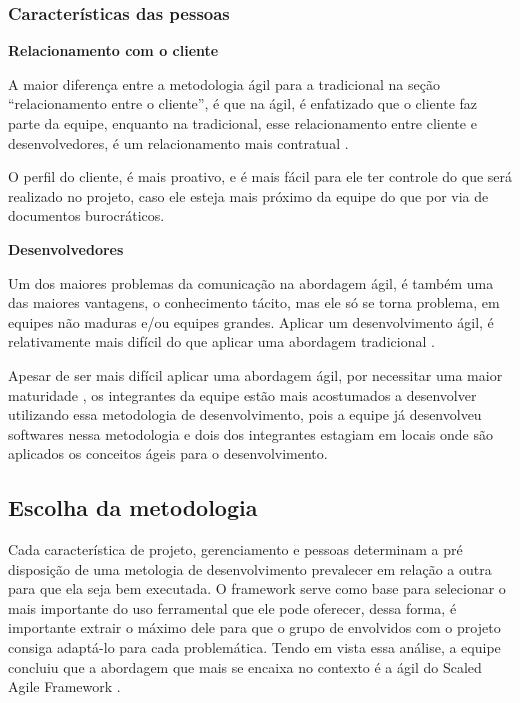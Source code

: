 \subsubsection{Características das pessoas}
\begin{description}

\item \textbf{Relacionamento com o cliente}

A maior diferença entre a metodologia ágil para a tradicional na seção “relacionamento entre o cliente”, é que na ágil, é enfatizado que o cliente faz parte da equipe, enquanto na tradicional, esse relacionamento entre cliente e desenvolvedores, é um relacionamento mais contratual \cite{boehm2004}.

O perfil do cliente, é mais proativo, e é mais fácil para ele ter controle do que será realizado no projeto, caso ele esteja mais próximo da equipe do que por via de documentos burocráticos.

\item \textbf{Desenvolvedores}

Um dos maiores problemas da comunicação na abordagem ágil, é também uma das maiores vantagens, o conhecimento tácito, mas ele só se torna problema, em equipes não maduras e/ou equipes grandes. Aplicar um desenvolvimento ágil, é relativamente mais difícil do que aplicar uma abordagem tradicional \cite{boehm2004}.

Apesar de ser mais difícil aplicar uma abordagem ágil, por necessitar uma maior maturidade \cite{boehm2004}, os integrantes da equipe estão mais acostumados a desenvolver utilizando essa metodologia de desenvolvimento, pois a equipe já desenvolveu softwares nessa metodologia e dois dos integrantes estagiam em locais onde são aplicados os conceitos ágeis para o desenvolvimento.
\end{description}
\subsection{Escolha da metodologia}

Cada característica de projeto, gerenciamento e pessoas determinam a pré disposição de uma metologia de desenvolvimento prevalecer em relação a outra para que ela seja bem executada. O framework serve como base para selecionar o mais importante do uso ferramental que ele pode oferecer, dessa forma, é importante extrair o máximo dele para que o grupo de envolvidos com o projeto consiga adaptá-lo para cada problemática. Tendo em vista essa análise, a equipe concluiu que a abordagem que mais se encaixa no contexto é a ágil do Scaled Agile Framework \cite{safe}.

